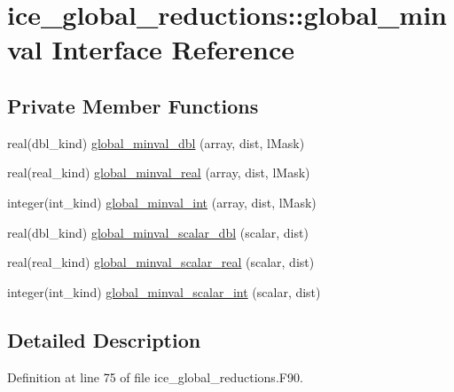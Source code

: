 \hypertarget{interfaceice__global__reductions_1_1global__minval}{
\section{ice\_\-global\_\-reductions::global\_\-minval Interface Reference}
\label{interfaceice__global__reductions_1_1global__minval}
}
\subsection*{Private Member Functions}
\begin{DoxyCompactItemize}
\item 
real(dbl\_\-kind) \hyperlink{interfaceice__global__reductions_1_1global__minval_a3ab7b811ed801129071ee11bc94def56}{global\_\-minval\_\-dbl} (array, dist, lMask)
\item 
real(real\_\-kind) \hyperlink{interfaceice__global__reductions_1_1global__minval_a2aaeb20a8f6fbc34ea7cdb3271067215}{global\_\-minval\_\-real} (array, dist, lMask)
\item 
integer(int\_\-kind) \hyperlink{interfaceice__global__reductions_1_1global__minval_adaebbe5ed1d261e1b79bd8881b2d9eb7}{global\_\-minval\_\-int} (array, dist, lMask)
\item 
real(dbl\_\-kind) \hyperlink{interfaceice__global__reductions_1_1global__minval_aa7816ee9fea9a15890a95db860825a90}{global\_\-minval\_\-scalar\_\-dbl} (scalar, dist)
\item 
real(real\_\-kind) \hyperlink{interfaceice__global__reductions_1_1global__minval_acb47ea72fe685904a9b7b632eca96184}{global\_\-minval\_\-scalar\_\-real} (scalar, dist)
\item 
integer(int\_\-kind) \hyperlink{interfaceice__global__reductions_1_1global__minval_a52c1c23cf1e9e7a47884afbbe5e6f4f0}{global\_\-minval\_\-scalar\_\-int} (scalar, dist)
\end{DoxyCompactItemize}


\subsection{Detailed Description}


Definition at line 75 of file ice\_\-global\_\-reductions.F90.

